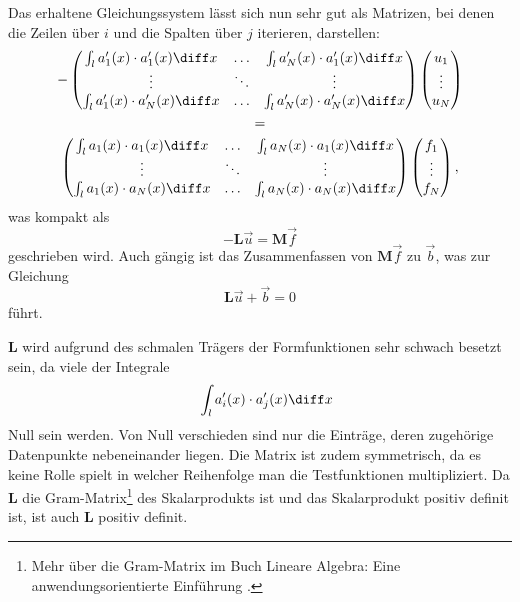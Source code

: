 Das erhaltene Gleichungssystem lässt sich nun sehr gut als Matrizen, bei denen die Zeilen über $i$ und die Spalten über $j$ iterieren, darstellen:
\begin{multline}
    -\left(
        \begin{matrix}
            \int_l a'_1(x) \cdot a'_1(x) \diff x & \hdots & \int_l a'_N(x) \cdot a'_1(x) \diff x \\
            \vdots                               & \ddots & \vdots                               \\
            \int_l a'_1(x) \cdot a'_N(x) \diff x & \hdots & \int_l a'_N(x) \cdot a'_N(x) \diff x \\
        \end{matrix}
    \right)
    \left(
        \begin{matrix}
            u_1 \\
            \vdots \\
            u_N
        \end{matrix}
    \right) \\
    = \\
    \left(
        \begin{matrix}
            \int_l a_1(x) \cdot a_1(x) \diff x & \hdots & \int_l a_N(x) \cdot a_1(x) \diff x \\
            \vdots                             & \ddots & \vdots                             \\
            \int_l a_1(x) \cdot a_N(x) \diff x & \hdots & \int_l a_N(x) \cdot a_N(x) \diff x \\
        \end{matrix}
    \right)
    \left(
        \begin{matrix}
            f_1 \\
            \vdots \\
            f_N
        \end{matrix}
    \right),
\end{multline}
was kompakt als
\begin{equation*}
    -\mathbf{L}\vec{u} = \mathbf{M}\vec{f}
\end{equation*}
geschrieben wird.
Auch gängig ist das Zusammenfassen von $\mathbf{M}\vec{f}$ zu $\vec{b}$, was zur Gleichung
\begin{equation*}
    \mathbf{L}\vec{u} + \vec{b} = 0
\end{equation*}
führt.

$\mathbf{L}$ wird aufgrund des schmalen Trägers der Formfunktionen sehr schwach besetzt sein, da viele der Integrale
\begin{equation*}
    \quad \int_l a'_i(x) \cdot a'_j(x) \diff x 
\end{equation*}
Null sein werden.
Von Null verschieden sind nur die Einträge, deren zugehörige Datenpunkte nebeneinander liegen.
Die Matrix ist zudem symmetrisch, da es keine Rolle spielt in welcher Reihenfolge man die Testfunktionen multipliziert.
Da $\mathbf{L}$ die Gram-Matrix\footnote{Mehr über die Gram-Matrix im Buch Lineare Algebra: Eine anwendungsorientierte Einführung \cite{buch:linalg}.} des Skalarprodukts ist und das Skalarprodukt positiv definit ist, ist auch $\mathbf{L}$ positiv definit.


